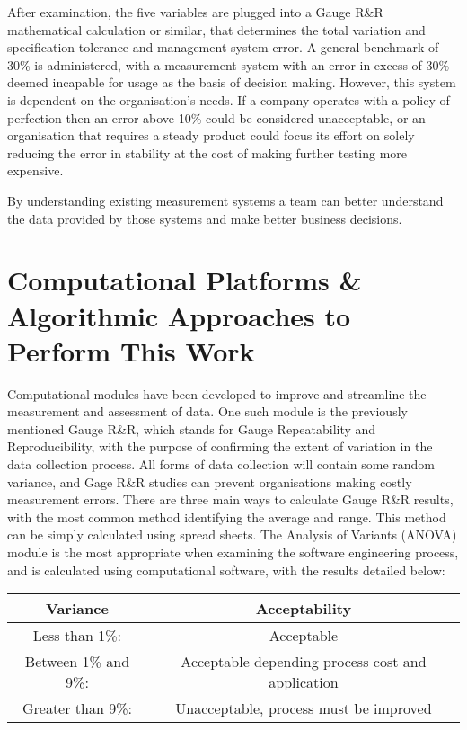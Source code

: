 \documentclass{article}
\begin{document}
After examination, the five variables are plugged into a Gauge R\&R mathematical calculation or similar, that determines the total variation and specification tolerance and management system error. A general benchmark of 30\% is administered, with a measurement system with an error in excess of 30\% deemed incapable for usage as the basis of decision making. However, this system is dependent on the organisation's needs. If a company operates with a policy of perfection then an error above 10\% could be considered unacceptable, or an organisation that requires a steady product could focus its effort on solely reducing the error in stability at the cost of making further testing more expensive. \newline

By understanding existing measurement systems a team can better understand the data provided by those systems and make better business decisions. \cite{morestream}

\section{Computational Platforms \& Algorithmic Approaches to Perform This Work} Computational modules have been developed to improve and streamline the measurement and assessment of data. One such module is the previously mentioned Gauge R\&R, which stands for Gauge Repeatability and Reproducibility, with the purpose of confirming the extent of variation in the data collection process. All forms of data collection will contain some random variance, and Gage R\&R studies can prevent organisations making costly measurement errors. There are three main ways to calculate Gauge R\&R results, with the most common method identifying the average and range. This method can be simply calculated using spread sheets. The Analysis of Variants (ANOVA) module is the most appropriate when examining the software engineering process, and is calculated using computational software, with the results detailed below:

\begin{center}
\begin{tabular}{||c c||} 
\hline
Variance & Acceptability \\ 
\hline
Less than 1\%: & Acceptable \\ 
\hline
Between 1\% and 9\%: & Acceptable depending process cost and application \\
\hline
Greater than 9\%: & Unacceptable, process must be improved \\
\hline
\end{tabular}
\end{center}
\end{document}
